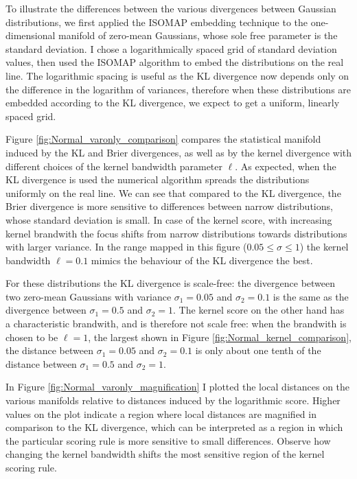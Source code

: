 To illustrate the differences between the various divergences between Gaussian distributions, we first applied the ISOMAP embedding technique to the one-dimensional manifold of zero-mean Gaussians, whose sole free parameter is the standard deviation. I chose a logarithmically spaced grid of standard deviation values, then used the ISOMAP algorithm to embed the distributions on the real line. The logarithmic spacing is useful as the KL divergence now depends only on the difference in the logarithm of variances, therefore when these distributions are embedded according to the KL divergence, we expect to get a uniform, linearly spaced grid.

Figure \ref{fig:Normal_varonly_comparison} compares the statistical manifold induced by the KL and Brier divergences, as well as by the kernel divergence with different choices of the kernel bandwidth parameter $\ell$. As expected, when the KL divergence is used the numerical algorithm spreads the distributions uniformly on the real line. We can see that compared to the KL divergence, the Brier divergence is more sensitive to differences between narrow distributions, whose standard deviation is small. In case of the kernel score, with increasing kernel brandwith the focus shifts from narrow distributions towards distributions with larger variance. In the range mapped in this figure ($0.05 \leq \sigma \leq 1$) the kernel bandwidth $\ell=0.1$ mimics the behaviour of the KL divergence the best.

For these distributions the KL divergence is scale-free: the divergence between two zero-mean Gaussians with variance $\sigma_1=0.05$ and $\sigma_2 = 0.1$ is the same as the divergence between $\sigma_1=0.5$ and $\sigma_2 = 1$. The kernel score on the other hand has a characteristic brandwith, and is therefore not scale free: when the brandwith is chosen to be $\ell=1$, the largest shown in Figure \ref{fig:Normal_kernel_comparison}, the distance between $\sigma_1=0.05$ and $\sigma_2 = 0.1$ is only about one tenth of the distance between $\sigma_1=0.5$ and $\sigma_2 = 1$.

In Figure \ref{fig:Normal_varonly_magnification} I plotted the local distances on the various manifolds relative to distances induced by the logarithmic score. Higher values on the plot indicate a region where local distances are magnified in comparison to the KL divergence, which can be interpreted as a region in which the particular scoring rule is more sensitive to small differences. Observe how changing the kernel bandwidth shifts the most sensitive region of the kernel scoring rule.

